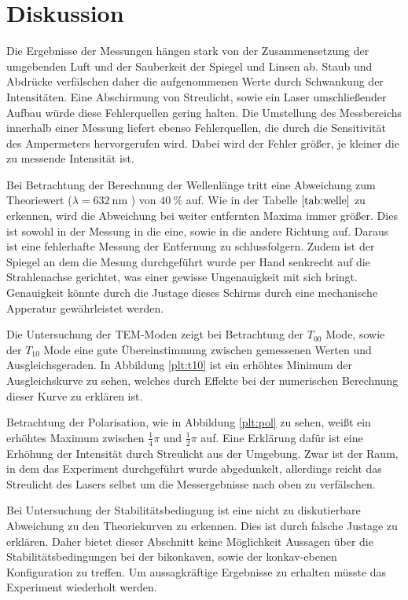 \newpage
\section{Diskussion}
Die Ergebnisse der Messungen hängen stark von der Zusammensetzung der umgebenden
Luft und der Sauberkeit der Spiegel und Linsen ab. Staub und Abdrücke verfälschen
daher die aufgenommenen Werte durch Schwankung der Intensitäten. Eine
Abschirmung von Streulicht, sowie ein Laser umschließender Aufbau würde diese
Fehlerquellen gering halten.
Die Umstellung des Messbereichs innerhalb einer Messung liefert ebenso
Fehlerquellen, die durch die Sensitivität des Ampermeters hervorgerufen wird.
Dabei wird der Fehler größer, je kleiner die zu messende Intensität ist.

Bei Betrachtung der Berechnung der Wellenlänge tritt eine Abweichung zum
Theoriewert ($\lambda = \SI{632}{\nano\meter}$ \cite{anleitung}) von
$\SI{40}{\percent}$ auf. Wie in der Tabelle $\ref{tab:welle}$ zu erkennen,
wird die Abweichung bei weiter entfernten Maxima immer größer. Dies ist sowohl
in der Messung in die eine, sowie in die andere Richtung auf. Daraus ist eine
fehlerhafte Messung der Entfernung zu schlussfolgern. Zudem ist der Spiegel an
dem die Mesung durchgeführt wurde per Hand senkrecht auf die Strahlenachse
gerichtet, was einer gewisse Ungenauigkeit mit sich bringt. Genauigkeit könnte
durch die Justage dieses Schirms durch eine mechanische Apperatur gewährleistet
werden.

Die Untersuchung der TEM-Moden zeigt bei Betrachtung der $T_{00}$ Mode, sowie
der $T_{10}$ Mode eine gute Übereinstimmung zwischen gemessenen Werten und
Ausgleichsgeraden. In Abbildung \ref{plt:t10} ist ein erhöhtes Minimum der
Ausgleichskurve zu sehen, welches durch Effekte bei der numerischen Berechnung
dieser Kurve zu erklären ist.

Betrachtung der Polarisation, wie in Abbildung \ref{plt:pol} zu sehen, weißt
ein erhöhtes Maximum zwischen $\frac{1}{4}\pi$ und $\frac{1}{2}\pi$ auf. Eine
Erklärung dafür ist eine Erhöhung der Intensität durch Streulicht aus der
Umgebung. Zwar ist der Raum, in dem das Experiment durchgeführt wurde
abgedunkelt, allerdings reicht das Streulicht des Lasers selbst um die
Messergebnisse nach oben zu verfälschen.

Bei Untersuchung der Stabilitätsbedingung ist eine nicht zu diskutierbare
Abweichung zu den Theoriekurven zu erkennen. Dies ist durch falsche Justage zu
erklären. Daher bietet dieser Abschnitt keine Möglichkeit Aussagen über die
Stabilitätsbedingungen bei der bikonkaven, sowie der konkav-ebenen Konfiguration
zu treffen. Um aussagkräftige Ergebnisse zu erhalten müsste das Experiment
wiederholt werden.
